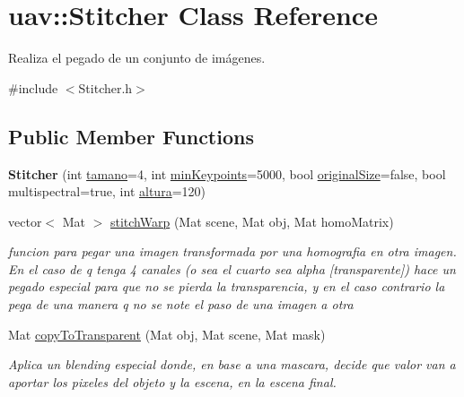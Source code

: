 \hypertarget{classuav_1_1Stitcher}{}\section{uav\+:\+:Stitcher Class Reference}
\label{classuav_1_1Stitcher}


Realiza el pegado de un conjunto de imágenes.  




{\ttfamily \#include $<$Stitcher.\+h$>$}

\subsection*{Public Member Functions}
\begin{DoxyCompactItemize}
\item 
\mbox{\label{classuav_1_1Stitcher_aea0ad0dfaa0803b84cb64a8b52fd3ed8}} 
{\bfseries Stitcher} (int \mbox{\hyperlink{classuav_1_1Stitcher_aecfe8592eb3d8445c0f3e8b722558acb}{tamano}}=4, int \mbox{\hyperlink{classuav_1_1Stitcher_a3b54e9be9bda44c4a04b14a645bd9521}{min\+Keypoints}}=5000, bool \mbox{\hyperlink{classuav_1_1Stitcher_a222f8247abb4fafba61d86078d8f9c16}{original\+Size}}=false, bool multispectral=true, int \mbox{\hyperlink{classuav_1_1Stitcher_a4dc4cd0546fef7f43b85d9079ea09f86}{altura}}=120)
\item 
vector$<$ Mat $>$ \mbox{\hyperlink{classuav_1_1Stitcher_a096e8020a5544325400743836c8ba58d}{stitch\+Warp}} (Mat scene, Mat obj, Mat homo\+Matrix)
\begin{DoxyCompactList}\small\item\em funcion para pegar una imagen transformada por una homografia en otra imagen. En el caso de q tenga 4 canales (o sea el cuarto sea alpha \mbox{[}transparente\mbox{]}) hace un pegado especial para que no se pierda la transparencia, y en el caso contrario la pega de una manera q no se note el paso de una imagen a otra \end{DoxyCompactList}\item 
Mat \mbox{\hyperlink{classuav_1_1Stitcher_a16bfb7a49f1e3a9c38ef03d72969094d}{copy\+To\+Transparent}} (Mat obj, Mat scene, Mat mask)
\begin{DoxyCompactList}\small\item\em Aplica un blending especial donde, en base a una mascara, decide que valor van a aportar los pixeles del objeto y la escena, en la escena final. \end{DoxyCompactList}\item 

\end{DoxyCompactItemize}
